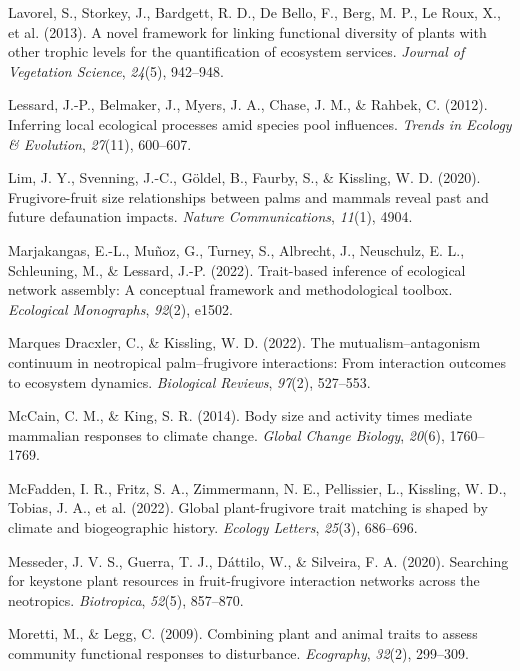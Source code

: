 \documentclass[
]{agujournal2019}
\newlength{\cslhangindent}
\newenvironment{CSLReferences}[2] %
 {\begin{list}{}{%
  \setlength{\itemindent}{0pt}
  \setlength{\leftmargin}{0pt}
  \setlength{\parsep}{0pt}
  \ifodd #1
   \setlength{\leftmargin}{\cslhangindent}
   \setlength{\itemindent}{-1\cslhangindent}
  \fi
  \setlength{\itemsep}{#2\baselineskip}}}
 {\end{list}}
\begin{document}
\begin{CSLReferences}{1}{0}
Lavorel, S., Storkey, J., Bardgett, R. D., De Bello, F., Berg, M. P., Le
Roux, X., et al. (2013). A novel framework for linking functional
diversity of plants with other trophic levels for the quantification of
ecosystem services. \emph{Journal of Vegetation Science}, \emph{24}(5),
942--948.

Lessard, J.-P., Belmaker, J., Myers, J. A., Chase, J. M., \& Rahbek, C.
(2012). Inferring local ecological processes amid species pool
influences. \emph{Trends in Ecology \& Evolution}, \emph{27}(11),
600--607.

Lim, J. Y., Svenning, J.-C., Göldel, B., Faurby, S., \& Kissling, W. D.
(2020). Frugivore-fruit size relationships between palms and mammals
reveal past and future defaunation impacts. \emph{Nature
Communications}, \emph{11}(1), 4904.

Marjakangas, E.-L., Muñoz, G., Turney, S., Albrecht, J., Neuschulz, E.
L., Schleuning, M., \& Lessard, J.-P. (2022). Trait-based inference of
ecological network assembly: A conceptual framework and methodological
toolbox. \emph{Ecological Monographs}, \emph{92}(2), e1502.

Marques Dracxler, C., \& Kissling, W. D. (2022). The
mutualism--antagonism continuum in neotropical palm--frugivore
interactions: From interaction outcomes to ecosystem dynamics.
\emph{Biological Reviews}, \emph{97}(2), 527--553.

McCain, C. M., \& King, S. R. (2014). Body size and activity times
mediate mammalian responses to climate change. \emph{Global Change
Biology}, \emph{20}(6), 1760--1769.

McFadden, I. R., Fritz, S. A., Zimmermann, N. E., Pellissier, L.,
Kissling, W. D., Tobias, J. A., et al. (2022). Global plant-frugivore
trait matching is shaped by climate and biogeographic history.
\emph{Ecology Letters}, \emph{25}(3), 686--696.

Messeder, J. V. S., Guerra, T. J., Dáttilo, W., \& Silveira, F. A.
(2020). Searching for keystone plant resources in fruit-frugivore
interaction networks across the neotropics. \emph{Biotropica},
\emph{52}(5), 857--870.

Moretti, M., \& Legg, C. (2009). Combining plant and animal traits to
assess community functional responses to disturbance. \emph{Ecography},
\emph{32}(2), 299--309.


\end{CSLReferences}
\end{document}
